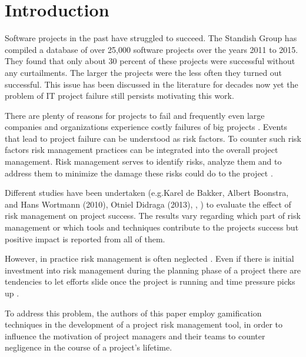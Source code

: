 \chapter{Introduction}
\label{ch:introduction}

Software projects in the past have struggled to succeed. The Standish Group \cite{thestandishgroupinternationalincChaosReport20152015} has compiled a database of over 25,000 software projects over the years 2011 to 2015. They found that only about 30 percent of these projects were successful without any curtailments. The larger the projects were the less often they turned out successful. This issue has been discussed in the literature for decades now yet the problem of IT project failure still persists motivating this work. \cite{thestandishgroupinternationalincChaosReport20152015}

There are plenty of reasons for projects to fail and frequently even large companies and organizations experience costly failures of big projects \cite{dwivediResearchInformationSystems2015}. Events that lead to project failure can be understood as risk factors. To counter such risk factors risk management practices can be integrated into the overall project management. Risk management serves to identify risks, analyze them and to address them to minimize the damage these risks could do to the project \cite{teschITProjectRisk2007}.

Different studies have been undertaken (e.g.Karel de Bakker, Albert Boonstra, and Hans Wortmann (2010), Otniel Didraga (2013), \cite{kwakProjectRiskManagement2004}, \cite{peixotoProjectRiskManagement2014}) to evaluate the effect of risk management on project success. The results vary regarding which part of risk management or which tools and techniques contribute to the projects success but positive impact is reported from all of them.

However, in practice risk management is often neglected \cite{kwakProjectRiskManagement2004}. Even if there is initial investment into risk management during the planning phase of a project there are tendencies to let efforts slide once the project is running and time pressure picks up \cite{peixotoProjectRiskManagement2014}.

To address this problem, the authors of this paper employ gamification techniques in the development of a project risk management tool, in order to influence the motivation of project managers and their teams to counter negligence in the course of a project’s lifetime.


